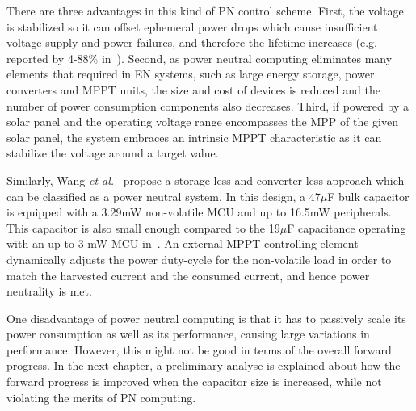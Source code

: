 There are three advantages in this kind of PN control scheme. First, the voltage is stabilized so it can offset ephemeral power drops which cause insufficient voltage supply and power failures, and therefore the lifetime increases (e.g. reported by 4-88\% in~\cite{balsamo2016graceful}). Second, as power neutral computing eliminates many elements that required in EN systems, such as large energy storage, power converters and MPPT units, the size and cost of devices is reduced and the number of power consumption components also decreases. Third, if powered by a solar panel and the operating voltage range encompasses the MPP of the given solar panel, the system embraces an intrinsic MPPT characteristic as it can stabilize the voltage around a target value.

Similarly, Wang \textit{et al.}~\cite{wang2016storage} propose a storage-less and converter-less approach which can be classified as a power neutral system. In this design, a 47$\mu$F bulk capacitor is equipped with a 3.29mW non-volatile MCU and up to 16.5mW peripherals. This capacitor is also small enough compared to the 19$\mu$F capacitance operating with an up to 3 mW MCU in~\cite{balsamo2016graceful}. An external MPPT controlling element dynamically adjusts the power duty-cycle for the non-volatile load in order to match the harvested current and the consumed current, and hence power neutrality is met. 

One disadvantage of power neutral computing is that it has to passively scale its power consumption as well as its performance, causing large variations in performance. However, this might not be good in terms of the overall forward progress. In the next chapter, a preliminary analyse is explained about how the forward progress is improved when the capacitor size is increased, while not violating the merits of PN computing. 



